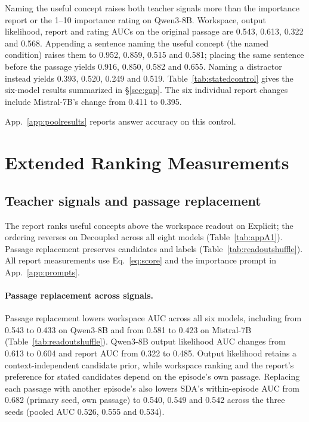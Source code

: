 Naming the useful concept raises both teacher signals more than
the importance report or the 1--10 importance rating on Qwen3-8B.
Workspace, output likelihood, report and rating AUCs on the original
passage are 0.543, 0.613, 0.322 and 0.568. Appending a sentence naming
the useful concept (the named condition) raises them to 0.952, 0.859,
0.515 and 0.581; placing the same sentence before the passage yields
0.916, 0.850, 0.582 and 0.655.
Naming a distractor instead yields 0.393, 0.520, 0.249 and 0.519.
Table~\ref{tab:statedcontrol} gives the six-model results summarized
in \S\ref{sec:gap}. The six individual report
changes include Mistral-7B's change from 0.411 to 0.395.



App.~\ref{app:poolresults} reports answer accuracy on this control.
\section{Extended Ranking Measurements}
\label{app:measurements}

\subsection{Teacher signals and passage replacement}
\label{app:context}

The report ranks useful concepts above the workspace readout on Explicit;
the ordering reverses on Decoupled across all eight models
(Table~\ref{tab:appA1}). Passage replacement preserves candidates and
labels (Table~\ref{tab:readoutshuffle}). All report measurements use
Eq.~\eqref{eq:score} and the importance prompt in App.~\ref{app:prompts}.



\paragraph{Passage replacement across signals.}
Passage replacement lowers workspace AUC across all six models,
including from 0.543 to 0.433 on Qwen3-8B and from 0.581 to 0.423 on
Mistral-7B (Table~\ref{tab:readoutshuffle}). Qwen3-8B output likelihood
AUC changes from 0.613 to 0.604 and report AUC from 0.322 to 0.485.
Output likelihood retains a context-independent candidate prior, while
workspace ranking and the report's preference for stated candidates
depend on the episode's own passage. Replacing each passage with another
episode's also lowers SDA's within-episode AUC from 0.682 (primary seed,
own passage) to 0.540, 0.549 and 0.542 across the three seeds (pooled AUC
0.526, 0.555 and 0.534).


